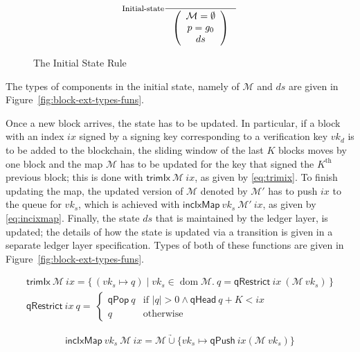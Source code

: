 \documentclass[11pt,a4paper]{article}
\DeclareMathOperator{\dom}{dom}
\newcommand\Set[2]{\{\,#1\mid#2\,\}}
\newcommand{\unionoverride}{\mathbin{\underrightarrow\cup}}
\newcommand{\fun}[1]{\mathsf{#1}}
\newcommand{\size}[1]{\left| #1 \right|}
\newcommand{\signmapname}{\mathcal{M}}
\newcommand{\trimixname}{trimIx}
\newcommand{\incixmapname}{incIxMap}
\newcommand{\qrestrname}{qRestrict}
\newcommand{\qpopname}{qPop}
\newcommand{\qheadname}{qHead}
\newcommand{\qpushname}{qPush}
\newcommand{\signmap}[1]{\fun{\signmapname} ~ #1}
\newcommand{\qrestr}[2]{\fun{\qrestrname} ~ #1 ~ #2}
\newcommand{\trimix}[2]{\fun{\trimixname} ~ #1 ~ #2}
\newcommand{\incixmap}[3]{\fun{\incixmapname} ~ #1 ~ #2 ~ #3}
\newcommand{\qpop}[1]{\fun{\qpopname} ~ #1}
\newcommand{\qhead}[1]{\fun{\qheadname} ~ #1}
\newcommand{\qpush}[1]{\fun{\qpushname} ~ #1}
\newcommand{\partialf}{\mapsto}
\begin{document}
\begin{figure}
  \begin{equation*}
    \inference[Initial-state]
    {}
    {\left(
        {\begin{array}{c}
           \signmapname = \emptyset \\
           p = g_0 \\
           ds
         \end{array}}
     \right)
   }
 \end{equation*}
 \caption{The Initial State Rule}
 \label{fig:init-bc-state}
\end{figure}

The types of components in the initial state, namely of $\fun{\signmapname}$
and $ds$ are given in Figure~\ref{fig:block-ext-types-funs}.

Once a new block arrives, the state has to be updated.
%
In particular, if a block with an index $ix$ signed by a signing key
corresponding to a verification key $vk_d$ is to be added to the blockchain,
the sliding window of the last $K$ blocks moves by one block and the map
$\fun{\signmapname}$ has to be updated for the key that signed the
$K^{\text{th}}$ previous block;
%
this is done with $\trimix{\signmapname}{ix}$, as given by
\eqref{eq:trimix}.
%
To finish updating the map, the updated version of $\signmapname$ denoted by
$\signmapname'$ has to push $ix$ to the queue for $vk_s$, which is achieved
with $\incixmap{vk_s}{\signmapname'}{ix}$, as given by
\eqref{eq:incixmap}.
%
Finally, the state $ds$ that is maintained by the ledger layer, is updated;
the details of how the state is updated via a transition is given in a
separate ledger layer specification.
%
Types of both of these functions are given in
Figure~\ref{fig:block-ext-types-funs}.


\begin{align}
  \label{eq:trimix}
  \trimix{\signmapname}{ix} = \Set{(vk_s \partialf q)}{vk_s \in \dom \signmapname.~
  q = \qrestr{ix}{(\signmap{vk_s}})} \\
  \qrestr{ix}{q} = \
  \begin{cases}
    \qpop{q} & \text{if } \size{q} > 0 \wedge \qhead{q} + K < ix \\
    q & \text{otherwise}
  \end{cases}
\end{align}

\begin{equation}
  \label{eq:incixmap}
  \incixmap{vk_s}{\signmapname}{ix} = \signmapname \unionoverride \{vk_s \partialf \qpush{ix}{(\signmap{vk_s})}\}
\end{equation}
\end{document}
